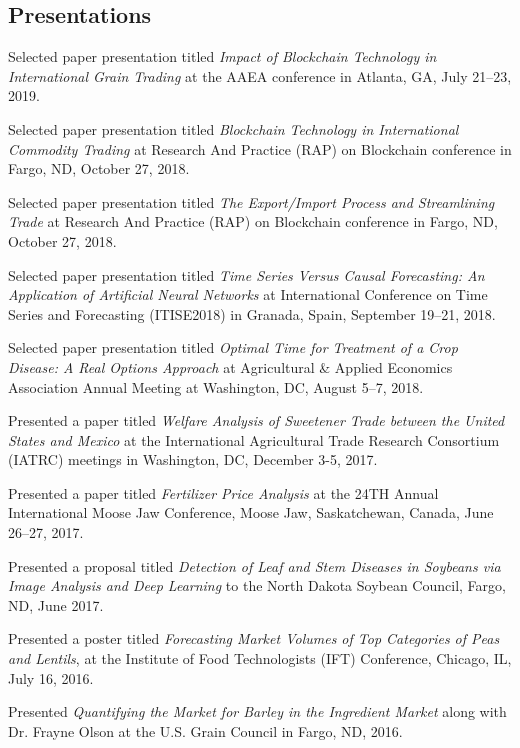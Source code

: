 \documentclass[margin,line]{res}
\begin{document}
\begin{resume}
\section{\sc Presentations}
\begin{etaremune}
\item Selected paper presentation titled \textit{Impact of Blockchain Technology in International Grain Trading} at the AAEA conference in Atlanta, GA, July 21--23, 2019.
\item Selected paper presentation titled \textit{Blockchain Technology in International Commodity Trading} at Research And Practice (RAP) on Blockchain conference in Fargo, ND, October 27, 2018.
\item Selected paper presentation titled \textit{The Export/Import Process and Streamlining Trade} at Research And Practice (RAP) on Blockchain conference in Fargo, ND, October 27, 2018.
\item Selected paper presentation titled \textit{Time Series Versus Causal Forecasting: An Application of Artificial Neural Networks} at International Conference on Time Series and Forecasting (ITISE2018) in Granada, Spain, September 19--21, 2018.
\item Selected paper presentation titled \textit{Optimal Time for Treatment of a Crop Disease: A Real Options Approach} at Agricultural \& Applied Economics Association Annual Meeting at Washington, DC, August 5--7, 2018.
\item Presented a paper titled \textit{Welfare Analysis of Sweetener Trade between the United States and Mexico} at the International Agricultural Trade Research Consortium (IATRC) meetings in Washington, DC, December 3-5, 2017.
\item Presented a paper titled \textit{Fertilizer Price Analysis} at the 24TH Annual International Moose Jaw Conference, Moose Jaw, Saskatchewan, Canada, June 26--27, 2017.
\item Presented a proposal titled \textit{Detection of Leaf and Stem Diseases in Soybeans via Image Analysis and Deep Learning} to the North Dakota Soybean Council, Fargo, ND, June 2017.
\item Presented a poster titled \textit{Forecasting Market Volumes of Top Categories of Peas and Lentils}, at the Institute of Food Technologists (IFT) Conference, Chicago, IL, July 16, 2016.
\item Presented \textit{Quantifying the Market for Barley in the Ingredient Market} along with Dr. Frayne Olson at the U.S. Grain Council in Fargo, ND, 2016.

\end{etaremune}
\end{resume}
\end{document}
